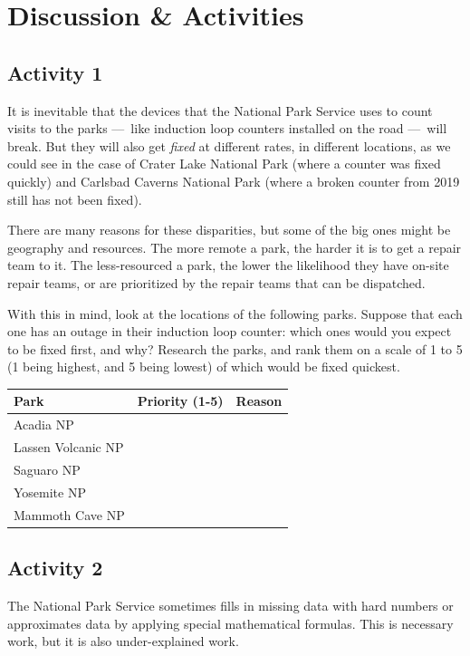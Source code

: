 \documentclass[
  letterpaper,
  DIV=11,
  numbers=noendperiod]{scrartcl}
\begin{document}
\section{Discussion \& Activities}

\subsection{Activity 1}\label{exercise-1}

It is inevitable that the devices that the National Park Service uses to
count visits to the parks ---~like induction loop counters installed on
the road ---~will break. But they will also get \emph{fixed} at
different rates, in different locations, as we could see in the case of
Crater Lake National Park (where a counter was fixed quickly) and
Carlsbad Caverns National Park (where a broken counter from 2019 still
has not been fixed).

There are many reasons for these disparities, but some of the big ones
might be geography and resources. The more remote a park, the harder it
is to get a repair team to it. The less-resourced a park, the lower the
likelihood they have on-site repair teams, or are prioritized by the
repair teams that can be dispatched.

With this in mind, look at the locations of the following parks. Suppose
that each one has an outage in their induction loop counter: which ones
would you expect to be fixed first, and why? Research the parks, and
rank them on a scale of 1 to 5 (1 being highest, and 5 being lowest) of
which would be fixed quickest.

\begin{longtable}[]{@{}lll@{}}
\toprule\noalign{}
Park & Priority (1-5) & Reason \\
\midrule\noalign{}
\endhead
\bottomrule\noalign{}
\endlastfoot
Acadia NP & & \\
Lassen Volcanic NP & & \\
Saguaro NP & & \\
Yosemite NP & & \\
Mammoth Cave NP & & \\
\end{longtable}

\subsection{Activity 2}\label{exercise-2}

The National Park Service sometimes fills in missing data with hard
numbers or approximates data by applying special mathematical formulas.
This is necessary work, but it is also under-explained work.
\end{document}

